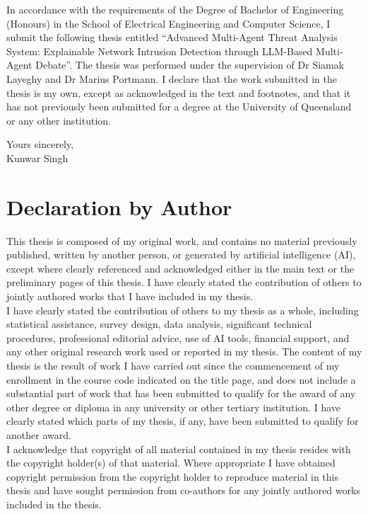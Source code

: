 \documentclass[../main.tex]{subfiles}
\begin{document}
In accordance with the requirements of the Degree of Bachelor of Engineering (Honours) in the School of Electrical Engineering and Computer Science, I submit the following thesis entitled ``Advanced Multi-Agent Threat Analysis System: Explainable Network Intrusion Detection through LLM-Based Multi-Agent Debate''. The thesis was performed under the supervision of Dr Siamak Layeghy and Dr Marius Portmann. I declare that the work submitted in the thesis is my own, except as acknowledged in the text and footnotes, and that it has not previously been submitted for a degree at the University of Queensland or any other institution.

\begin{flushright}
	Yours sincerely,\\
	\vspace{10mm}
	Kunwar Singh
\end{flushright}

\chapter{Declaration by Author}

This thesis is composed of my original work, and contains no material previously published, written by another person, or generated by artificial intelligence (AI), except where clearly referenced and acknowledged either in the main text or the preliminary pages of this thesis. I have clearly stated the contribution of others to jointly authored works that I have included in my thesis.\\

I have clearly stated the contribution of others to my thesis as a whole, including statistical assistance, survey design, data analysis, significant technical procedures, professional editorial advice, use of AI tools, financial support, and any other original research work used or reported in my thesis. The content of my thesis is the result of work I have carried out since the commencement of my enrollment in the course code indicated on the title page, and does not include a substantial part of work that has been submitted to qualify for the award of any other degree or diploma in any university or other tertiary institution. I have clearly stated which parts of my thesis, if any, have been submitted to qualify for another award.\\

I acknowledge that copyright of all material contained in my thesis resides with the copyright holder(s) of that material. Where appropriate I have obtained copyright permission from the copyright holder to reproduce material in this thesis and have sought permission from co-authors for any jointly authored works included in the thesis.
\end{document}
